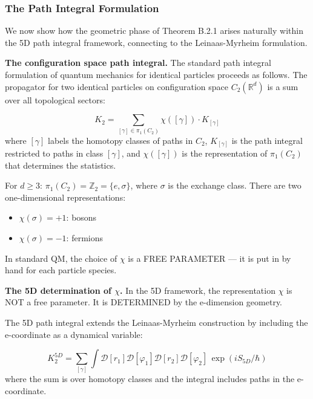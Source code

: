 \documentclass[aps,prd,preprint,superscriptaddress,longbibliography,floatfix]{revtex4-2}
\theoremstyle{remark}
\begin{document}
\subsubsection{The Path Integral Formulation}

We now show how the geometric phase of Theorem B.2.1 arises naturally within the 5D path integral framework, connecting to the Leinaas-Myrheim formulation.

\textbf{The configuration space path integral.} The standard path integral formulation of quantum mechanics for identical particles \cite{LeinaasMyrhei1977} proceeds as follows. The propagator for two identical particles on configuration space $C_{2}(\mathbb{R}^{d})$ is a sum over all topological sectors:


\begin{equation}
    K_{2} = \sum_{[\gamma] \in \pi_{1}(C_{2})} \chi([\gamma]) \cdot K_{[\gamma]}
\end{equation}
where $[\gamma]$ labels the homotopy classes of paths in $C_{2}$, $K_{[\gamma]}$ is the path integral restricted to paths in class $[\gamma]$, and $\chi([\gamma])$ is the representation of $\pi_{1}(C_{2})$ that determines the statistics.

For $d \geq 3$: $\pi_{1}(C_{2}) = \mathbb{Z}_{2} = \{e, \sigma\}$, where $\sigma$ is the exchange class. There are two one-dimensional representations:


\begin{itemize}
  \item $\chi(\sigma) = +1$: bosons
  \item $\chi(\sigma) = -1$: fermions
\end{itemize}

In standard QM, the choice of $\chi$ is a FREE PARAMETER --- it is put in by hand for each particle species.

\textbf{The 5D determination of $\chi$.} In the 5D framework, the representation $\chi$ is NOT a free parameter. It is DETERMINED by the e-dimension geometry.

The 5D path integral extends the Leinaas-Myrheim construction by including the e-coordinate as a dynamical variable:


\begin{equation}
    K_{2}^{5D} = \sum_{[\gamma]} \int \mathcal{D}[r_{1}] \mathcal{D}[\varphi_{1}] \mathcal{D}[r_{2}] \mathcal{D}[\varphi_{2}] \, \exp(iS_{5D}/\hbar)
\end{equation}
where the sum is over homotopy classes and the integral includes paths in the e-coordinate.
\end{document}
